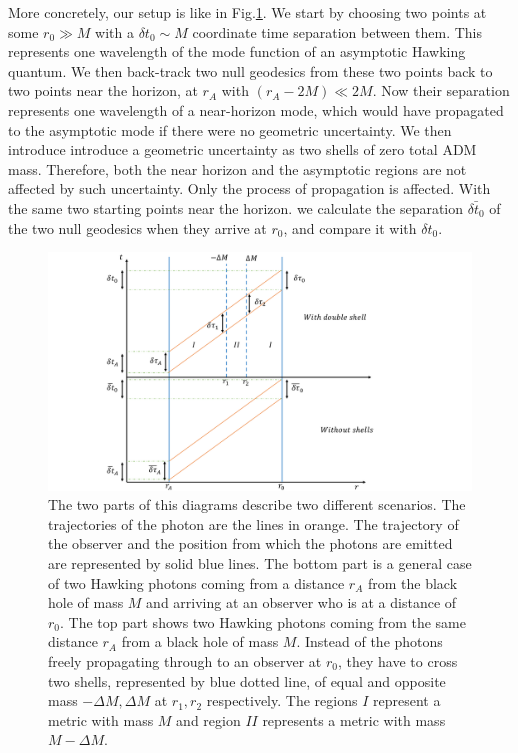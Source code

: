 \documentclass[aps,showpacs,twocolumn,floats,prd,superscriptaddress,nofootinbib]{revtex4-1}
\begin{document}
More concretely, our setup is like in Fig.\ref{fig-setup}. 
We start by choosing two points at some $r_0\gg M$ with a $\delta t_0\sim M$ coordinate time separation between them.
This represents one wavelength of the mode function of an asymptotic Hawking quantum.
We then back-track two null geodesics from these two points back to two points near the horizon, at $r_A$ with $(r_A-2M)\ll 2M$.
Now their separation represents one wavelength of a near-horizon mode, which would have propagated to the asymptotic mode if there were no geometric uncertainty. 
We then introduce introduce a geometric uncertainty as two shells of zero total ADM mass. 
Therefore, both the near horizon and the asymptotic regions are not affected by such uncertainty.
Only the process of propagation is affected.
With the same two starting points near the horizon. we calculate the separation $\bar{\delta t_0}$ of the two null geodesics when they arrive at $r_0$, and compare it with $\delta t_0$.

\begin{figure}[tb]
\begin{center}
\includegraphics[scale = 0.6]{Propertime.pdf}
\caption{The two parts of this diagrams describe two different scenarios. The trajectories of the photon are the lines in orange. The trajectory of the observer and the position from which the photons are emitted are represented by solid blue lines. The bottom part is a general case of two Hawking photons coming from a distance $r_A$ from the black hole of mass $M$ and arriving at an observer who is at a distance of $r_0$. The top part shows two Hawking photons coming from the same distance $r_A$ from a black hole of mass $M$. Instead of the photons freely propagating through to an observer at $r_0$, they have to cross two shells, represented by blue dotted line, of equal and opposite mass $-\Delta M, \Delta M$ at $r_{1}, r_{2}$ respectively. The regions $I$ represent a metric with mass $M$ and region $II$ represents a metric with mass $M-\Delta M$.}
\label{fig-setup}
\end{center}
\end{figure}
\end{document}
